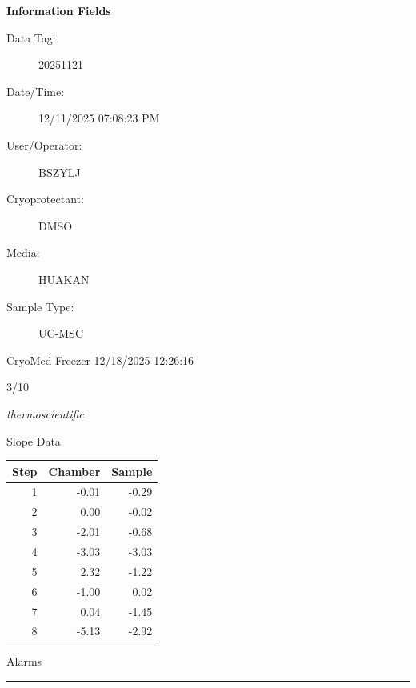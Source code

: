 \documentclass[UTF8,10pt,a4paper,fontset=fandol]{ctexart}
\newcommand{\fieldvalue}[1]{#1}
\newcommand{\handwritten}[1]{#1}
\begin{document}
\begin{minipage}[t]{0.48\linewidth}
\textbf{Information Fields}

\begin{description}
\item[Data Tag:]
\fieldvalue{20251121}

\item[Date/Time:]
\fieldvalue{12/11/2025 07:08:23 PM}

\item[User/Operator:]
\fieldvalue{BSZYLJ}

\item[Cryoprotectant:]
\fieldvalue{DMSO}

\item[Media:]
\fieldvalue{HUAKAN}

\item[Sample Type:]
\fieldvalue{UC-MSC}
\end{description}
\end{minipage}

\medskip
\noindent CryoMed Freezer \hfill 12/18/2025 12:26:16

\handwritten{3/10}

\newpage

\begin{center}
\textit{thermoscientific}
\end{center}

\noindent
\begin{minipage}[t]{0.38\linewidth}
\centering
Slope Data

\vspace{0.2em}
\begin{tabular}{@{}r r r@{}}
\hline
Step & Chamber & Sample\\
\hline
1 & -0.01 & -0.29\\
2 & 0.00 & -0.02\\
3 & -2.01 & -0.68\\
4 & -3.03 & -3.03\\
5 & 2.32 & -1.22\\
6 & -1.00 & 0.02\\
7 & 0.04 & -1.45\\
8 & -5.13 & -2.92\\
\end{tabular}
\end{minipage}
\hfill
\begin{minipage}[t]{0.48\linewidth}
\centering
Alarms

\vspace{0.2em}
\rule{\linewidth}{0.4pt}
\end{minipage}
\end{document}
